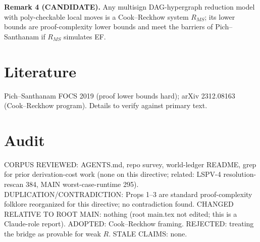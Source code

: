 \documentclass{article}\usepackage{amsmath,amssymb,amsthm}
\begin{document}
\textbf{Remark 4 (CANDIDATE).} Any multisign DAG-hypergraph reduction model with poly-checkable local moves is a Cook--Reckhow system $R_{MS}$; its lower bounds are proof-complexity lower bounds and meet the barriers of Pich--Santhanam if $R_{MS}$ simulates EF.

\section*{Literature}
Pich--Santhanam FOCS 2019 (proof lower bounds hard); arXiv 2312.08163 (Cook--Reckhow program). Details to verify against primary text.

\section*{Audit}
CORPUS REVIEWED: AGENTS.md, repo survey, world-ledger README, grep for prior derivation-cost work (none on this directive; related: LSPV-4 resolution-rescan 384, MAIN worst-case-runtime 295). DUPLICATION/CONTRADICTION: Props 1--3 are standard proof-complexity folklore reorganized for this directive; no contradiction found. CHANGED RELATIVE TO ROOT MAIN: nothing (root main.tex not edited; this is a Claude-role report). ADOPTED: Cook--Reckhow framing. REJECTED: treating the bridge as provable for weak $R$. STALE CLAIMS: none.
\end{document}

